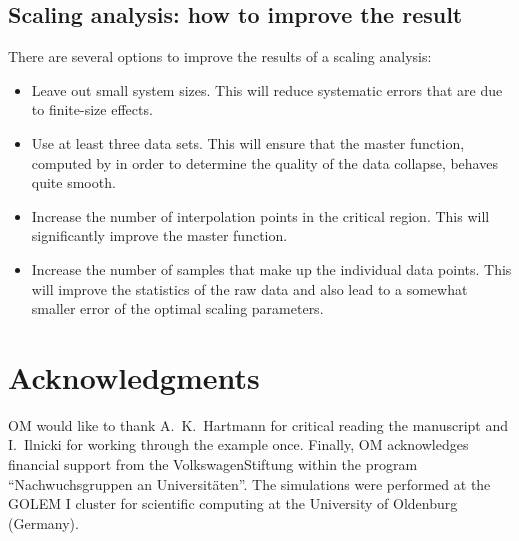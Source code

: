 \subsection{Scaling analysis: how to improve the result}
\label{ASAsect04subsect03}
There are several options to improve the results of a scaling analysis:
\begin{itemize}
\item Leave out small system sizes. This will reduce systematic errors that are 
due to finite-size effects.
\item Use at least three data sets. This will ensure that the master function,
computed by \myProg{} in order to determine the quality of the data collapse, behaves
quite smooth.
\item Increase the number of interpolation points in the critical region. This
will significantly improve the master function.
\item Increase the number of samples that make up the individual data points. 
This will improve the statistics of the raw data and also lead to a somewhat
smaller error of the optimal scaling parameters.
\end{itemize}

\section*{Acknowledgments}
OM would like to thank A.\ K.\ Hartmann for critical reading the 
manuscript and I.\ Ilnicki for working through the example once. 
Finally, OM acknowledges financial support from the VolkswagenStiftung
within the program  ``Nachwuchsgruppen an Universit\"aten''. The
simulations were performed at the GOLEM I cluster for scientific 
computing at the University of Oldenburg (Germany).

